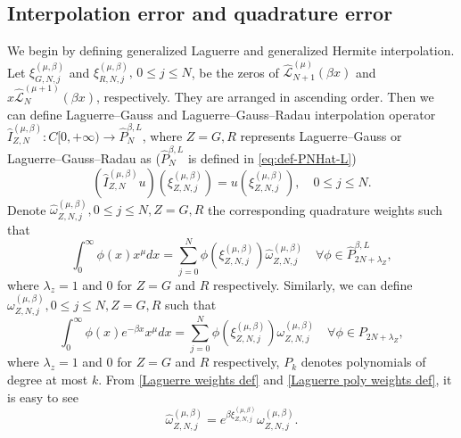 \documentclass[pdflatex,sn-aps]{sn-jnl}%
\theoremstyle{thmstyleone}%
\theoremstyle{thmstyletwo}%
\theoremstyle{thmstylethree}%
\begin{document}
\subsection{Interpolation error and quadrature error}
\label{sec: interpolation and quadrature}
We begin by defining generalized Laguerre and generalized Hermite interpolation.
Let $\xi_{G, N, j}^{(\mu, \beta)}$ and $\xi_{R, N, j}^{(\mu, \beta)},\, 0\leqslant j \leqslant N$,
be the zeros of $\widehat{\mathscr{L}}^{(\mu)}_{N+1}(\beta x)$ and
$x\widehat{\mathscr{L}}_N^{(\mu+1)}(\beta x)$, respectively. 
They are arranged in ascending order. Then we can define Laguerre--Gauss and Laguerre--Gauss--Radau interpolation operator $\widehat{I}_{Z, N}^{(\mu,\beta)}: C[0,+\infty) \rightarrow \widehat{P}_N^{\beta,L}$,
where $Z=G, R$ represents Laguerre--Gauss or Laguerre--Gauss--Radau as ($\widehat{P}_N^{\beta,L}$ is defined in \eqref{eq:def-PNHat-L})
\begin{equation}\label{eq:Laguerre interpolation def}
  \left(\widehat{I}_{Z, N}^{(\mu,\beta)} u\right) \left(\xi_{Z, N, j}^{(\mu, \beta)}\right) = u\left(\xi_{Z, N, j}^{(\mu, \beta)}\right), \quad 0\leqslant j \leqslant N.
\end{equation}
Denote $\widehat{\omega}_{Z, N, j}^{(\mu, \beta)}, 0 \leqslant j \leqslant N, Z = G,R$ the corresponding
quadrature weights such that
\begin{equation}\label{Laguerre weights def}
  \int_{0}^\infty \phi(x) x^\mu d x=\sum_{j=0}^N \phi\left(\xi_{Z, N, j}^{(\mu, \beta)}\right) \widehat{\omega}_{Z, N, j}^{(\mu, \beta)} \quad \forall \phi \in \widehat{P}_{2 N+\lambda_Z}^{\beta, L},
\end{equation}
where $\lambda_z = 1$ and $0$ for $Z=G$ and $R$ respectively.
Similarly, we can define $\omega_{Z, N, j}^{(\mu, \beta)}, 0 \leqslant j \leqslant N, Z = G,R$ such that
\begin{equation}\label{Laguerre poly weights def}
  \int_{0}^\infty \phi(x) e^{-\beta x} x^\mu d x=\sum_{j=0}^N \phi\left(\xi_{Z, N, j}^{(\mu, \beta)}\right) \omega_{Z, N, j}^{(\mu, \beta)} \quad \forall \phi \in P_{2 N+\lambda_Z},
\end{equation}
where $\lambda_z = 1$ and $0$ for $Z=G$ and $R$ respectively, $P_k$ denotes polynomials of degree at most $k$.
From \eqref{Laguerre weights def} and \eqref{Laguerre poly weights def}, it is easy to see
\begin{equation}\label{eq:0903-12}
  \widehat{\omega}_{Z, N, j}^{(\mu, \beta)}=e^{\beta \xi_{Z, N, j}^{(\mu, \beta)}} \omega_{Z, N, j}^{(\mu, \beta)}.
\end{equation}
\end{document}
